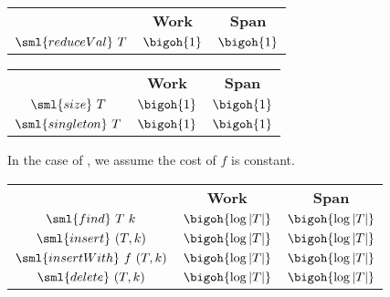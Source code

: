 \begin{cluster}
\label{grp:cst:treap-aug-table::reduced-values}

\begin{costspec}
\label{cst:treap-aug-table::reduced-values}
\begin{tabular}{c|c|c}
& \textbf{Work} & \textbf{Span} \\
$\sml{reduceVal}~T$ & $\bigoh{1}$ & $\bigoh{1}$
\end{tabular}

\end{costspec}
\end{cluster}

\begin{cluster}
\label{grp:cst:treap-aug-table::constant-work-operations}

\begin{costspec}
\label{cst:treap-aug-table::constant-work-operations}
\begin{tabular}{c|c|c}
& \textbf{Work} & \textbf{Span} \\
$\sml{size}~T$ & $\bigoh{1}$ & $\bigoh{1}$ \\
$\sml{singleton}~T$ & $\bigoh{1}$ & $\bigoh{1}$ \\
\end{tabular}

\end{costspec}
\end{cluster}

\begin{cluster}
\label{grp:cst:treap-aug-table::single-element-operations}

\begin{costspec}
\label{cst:treap-aug-table::single-element-operations}
In the case of , we assume the cost of $f$ is constant.
\begin{tabular}{c|c|c}
& \textbf{Work} & \textbf{Span} \\
$\sml{find}~T~k$ & $\bigoh{\log|T|}$ & $\bigoh{\log|T|}$ \\
$\sml{insert}~(T, k)$ & $\bigoh{\log|T|}$ & $\bigoh{\log|T|}$ \\
$\sml{insertWith}~f~(T, k)$ & $\bigoh{\log|T|}$ & $\bigoh{\log|T|}$ \\
$\sml{delete}~(T, k)$ & $\bigoh{\log|T|}$ & $\bigoh{\log|T|}$
\end{tabular}

\end{costspec}
\end{cluster}


